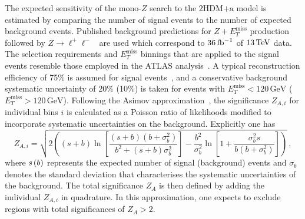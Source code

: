 \documentclass[review]{elsarticle}
\newcommand{\MET}{\ensuremath{E_T^\mathrm{miss}}\xspace}
\newcommand{\hdma}{\ensuremath{\textrm{2HDM+a}}\xspace}
\begin{document}
 The expected sensitivity of the mono-$Z$ search to the \hdma model is estimated by comparing the number of  signal events to the number of expected background events. Published background predictions for $Z+\MET$ production followed by $Z \to \ell^+ \ell^-$~\cite{Aaboud:2017bja} are used which correspond to $36 \, {\rm fb}^{-1}$ of $13 \, {\rm TeV}$ data. The selection requirements and \MET binnings that are applied to the signal events resemble those employed in the ATLAS analysis~\cite{Aaboud:2017bja}. A typical reconstruction efficiency of 75\% is assumed for signal events~\cite{Sirunyan:2017qfc},  and a conservative background systematic uncertainty of 20\% (10\%) is taken for events with $\MET < 120  \, {\mathrm{GeV}}$ ($\MET > 120  \, {\mathrm{GeV}}$). Following the Asimov approximation~\cite{Cowan:2010js}, the significance $Z_{A,i}$ for individual bins $i$ is calculated as a Poisson ratio of likelihoods modified to incorporate systematic uncertainties on the background. Explicitly one has \cite{Cowan:2012}
\begin{equation}
\label{eq:significance_wsyst}
Z_{A, i} = \sqrt{ 2 \left ( \left ( s + b \right ) \ln \left [ \frac{\left (s+b \right ) \left (b + \sigma_b^2 \right )}{b^2 + \left ( s +b \right ) \sigma_b^2 } \right ]  - \frac{b^2}{\sigma_b^2} \ln \left [ 1 + \frac{\sigma_b^2 s}{b \left ( b + \sigma_b^2 \right )} \right ] \right ) } \,, 
\end{equation}
where $s \hspace{0.5mm} \mathrm{(}b\mathrm{)}$ represents the expected number of signal (background) events and $\sigma_b$ denotes the standard deviation that characterises the systematic uncertainties of the background. The total significance $Z_A$ is then defined by adding the individual $Z_{A, i}$ in quadrature.   In this approximation, one expects to exclude regions with total significances of $Z_A > 2$. 
\end{document}
